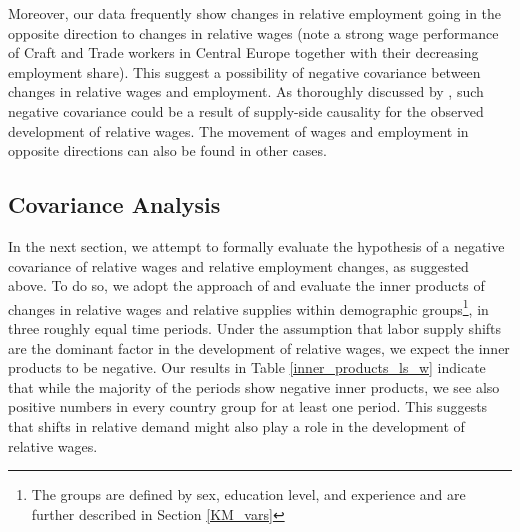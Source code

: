 \documentclass[11pt]{article}
\begin{document}


Moreover, our data frequently show changes in relative employment going in the opposite direction to changes in relative wages (note a strong wage performance of Craft and Trade workers in Central Europe together with their decreasing employment share). This suggest a possibility of negative covariance between changes in relative wages and employment. As thoroughly discussed by \citep{katz1992changes},  such negative covariance could be a result of supply-side causality for the observed development of relative wages. The movement of wages and employment in opposite directions can also be found in other cases.

\subsection{Covariance Analysis}\label{covariance_analysis}

In the next section, we attempt to formally evaluate the hypothesis of a negative covariance of relative wages and relative employment changes, as suggested above. To do so, we adopt the approach of \cite{katz1992changes} and evaluate the inner products of changes in relative wages and relative supplies within demographic groups\footnote{The groups are defined by sex, education level, and experience and are further described in Section \ref{KM_vars}}, in three roughly equal time periods. Under the assumption that labor supply shifts are the dominant factor in the development of relative wages, we expect the inner products to be negative. Our results in Table \ref{inner_products_ls_w} indicate that while the majority of the periods show negative inner products, we see also positive numbers in every country group for at least one period. This suggests that shifts in relative demand might also play a role in the development of relative wages.
\end{document}
